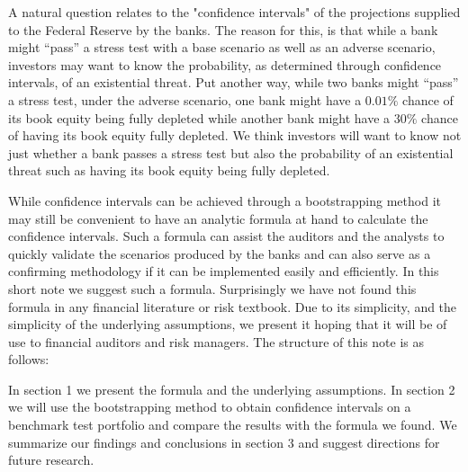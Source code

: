 \documentclass[a4paper]{amsart}
\begin{document}
A natural question relates to the "confidence intervals" of the projections supplied to the Federal Reserve by the banks. The reason for this, is that while a bank might “pass” a stress test with a base scenario as well as an adverse scenario, investors may want to know the probability, as determined through confidence intervals, of an existential threat.  Put another way, while two banks might “pass” a stress test, under the adverse scenario, one bank might have a $0.01\%$ chance of its book equity being fully depleted while another bank might have a $30\%$ chance of having its book equity fully depleted.  We think investors will want to know not just whether a bank passes a stress test but also the probability of an existential threat such as having its book equity being fully depleted.

While confidence intervals can be achieved through a bootstrapping method it may still be convenient to have an analytic formula at hand to calculate the confidence intervals. Such a formula can assist the auditors and the analysts to quickly validate the scenarios produced by the banks and can also serve as a confirming  methodology if it can be implemented easily and efficiently. In this short note we suggest such a formula. Surprisingly we have not found this formula in any financial literature or risk textbook. Due to its simplicity, and the simplicity of the underlying assumptions, we present it hoping that it  will be of use to financial auditors and risk managers. The structure of this note is as follows:

In section 1 we present the formula and the underlying assumptions. In section 2 we will use the bootstrapping method to obtain confidence intervals on a benchmark test portfolio and compare the results with the formula we found. We summarize our findings and conclusions in section 3 and suggest directions for future research.

 
\end{document}
